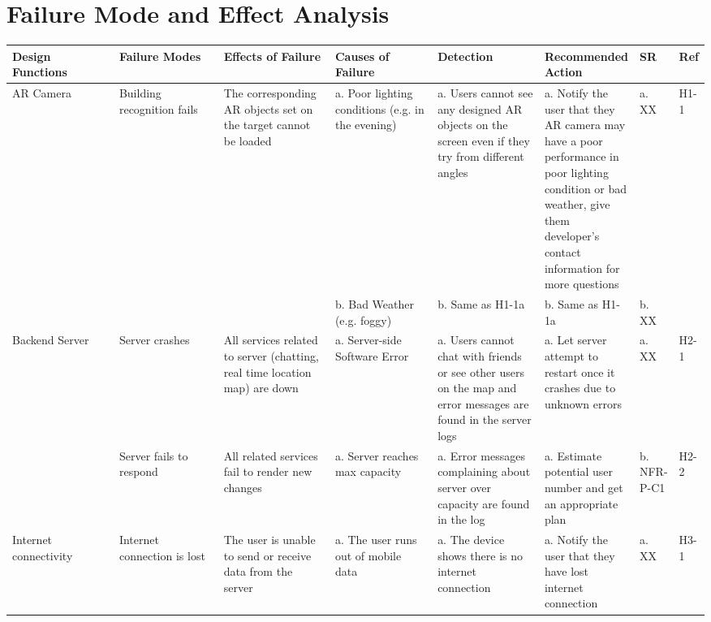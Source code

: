 \documentclass{article}
\begin{document}
\section{Failure Mode and Effect Analysis}
\begin{table}[H]
    \begin{adjustbox}{width=(/5)}
    \centering
    

    \begin{tabular}{|p{0.20\linewidth} | p{0.20\linewidth} | p{0.20\linewidth}|  p{0.20\linewidth}|  p{0.21\linewidth}|  p{0.30\linewidth}|  p{0.08\linewidth}|p{0.07\linewidth}| }
    \hline
         \textbf{Design Functions} & \textbf{Failure Modes} & \textbf{Effects of Failure} & \textbf{Causes of Failure} &\textbf{Detection}& \textbf{Recommended Action} & \textbf{SR} & \textbf{Ref}\\
         \hline
         AR Camera      &     Building recognition fails      &      The corresponding AR objects set on the target cannot be loaded      &      a. Poor lighting conditions (e.g. in the evening)      &      a. Users cannot see any designed AR objects on the screen even if they try from different angles      &      a. Notify the user that they AR camera may have a poor performance in poor lighting condition or bad weather, give them developer's contact information for more questions      &      a. XX      &      H1-1      \\
         &&&      b. Bad Weather (e.g. foggy)      &      b. Same as H1-1a      &      b. Same as H1-1a      &      b. XX      &      \\
         \hline
         Backend Server     &    Server crashes      &      All services related to server (chatting, real time location map) are down      &      a. Server-side Software Error      &      a. Users cannot chat with friends or see other users on the map and error messages are found in the server logs      &      a. Let server attempt to restart once it crashes due to unknown errors      &      a. XX      &      H2-1      \\
         &      Server fails to respond      &       All related services fail to render new changes      &      a. Server reaches max capacity      &      a. Error messages complaining about server over capacity are found in the log      &      a. Estimate potential user number and get an appropriate plan      &      b. NFR-P-C1      &      H2-2      \\
         \hline
        Internet connectivity      &      Internet connection is lost      &       The user is unable to send or receive data from the server     &      a. The user runs out of mobile data      &      a. The device shows there is no internet connection       &      a. Notify the user that they have lost internet connection      &      a. XX      &      H3-1      \\

\end{tabular}
\end{adjustbox}
\end{table}
\end{document}
